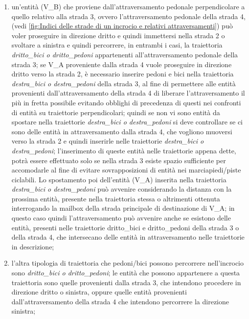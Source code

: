 \begin{enumerate}
\begin{enumerate}
\item un'entità (V\_B) che proviene dall'attraversamento pedonale perpendicolare a quello relativo alla strada 3, ovvero l'attraversamento pedonale della strada 4, (vedi \ref{fig:Indici delle strade di un incrocio e relativi attraversamenti}) può voler proseguire in direzione dritto e quindi immettersi nella strada 2 o svoltare a sinistra e quindi percorrere, in entrambi i casi, la traiettoria \textit{drit\-to\_bi\-ci o drit\-to\_pe\-do\-ni} appartenenti all'attraversamento pedonale della strada 3; se V\_A proveniente dalla strada 4 vuole proseguire in direzione dritto verso la strada 2, è necessario inserire pedoni e bici nella traiettoria \textit{des\-tra\_bi\-ci o des\-tra\_pe\-do\-ni} della strada 3, al fine di permettere alle entità provenienti dall'attraversamento della strada 4 di liberare l'attraversamento il più in fretta possibile evitando obblighi di precedenza di questi nei confronti di entità su traiettorie perpendicolari; quindi se non vi sono entità da spostare nella traiettorie \textit{des\-tra\_bi\-ci o des\-tra\_pe\-do\-ni} si deve controllare se ci sono delle entità in attraversamento dalla strada 4, che vogliono muoversi verso la strada 2 e quindi inserirle nelle traiettorie \textit{des\-tra\_bi\-ci o des\-tra\_pe\-do\-ni}; l'inserimento di queste entità nelle traiettorie appena dette, potrà essere effettuato solo se nella strada 3 esiste spazio sufficiente per accomodarle al fine di evitare sovrapposizioni di entità nei marciapiedi/piste ciclabili. Lo spostamento poi dell'entità (V\_A) inserita nella traiettoria \textit{des\-tra\_bi\-ci o des\-tra\_pe\-do\-ni} può avvenire considerando la distanza con la prossima entità, presente nella traiettoria stessa o altrimenti ottenuta interrogando la mailbox della strada principale di destinazione di V\_A; in questo caso quindi l'attraversamento può avvenire anche se esistono delle entità, presenti nelle traiettorie drit\-to\_bi\-ci e drit\-to\_pe\-do\-ni della strada 3 o della strada 4, che intersecano delle entità in attraversamento nelle traiettorie in descrizione;
\item l'altra tipologia di traiettoria che pedoni/bici possono percorrere nell'incrocio sono \textit{drit\-to\_bi\-ci o drit\-to\_pe\-do\-ni}; le entità che possono appartenere a questa traiettoria sono quelle provenienti dalla strada 3, che intendono procedere in direzione dritto o sinistra, oppure quelle entità provenienti dall'attraversamento della strada 4 che intendono percorrere la direzione sinistra;\\

\end{enumerate}
\end{enumerate}

